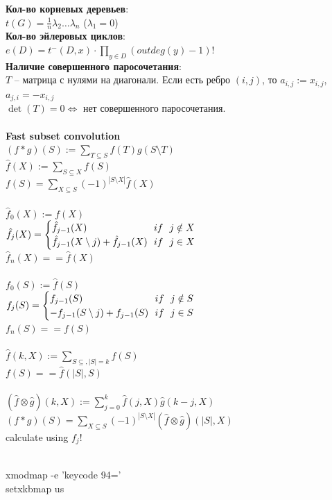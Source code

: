 \documentclass[a4paper,10pt, twocolumn]{article}
\begin{document}
{\bf Кол-во корневых деревьев}:\\
$t(G)=\frac 1 n \lambda_2 \ldots \lambda_n$ ($\lambda_1=0$)\\
{\bf Кол-во эйлеровых циклов}:\\
$e(D)=t^-(D,x) \cdot \prod\limits_{y\in D} (outdeg(y)-1)!$\\
{\bf Наличие совершенного паросочетания}:\\
$T$ -- матрица с нулями на диагонали. Если есть ребро $(i, j)$, то $a_{i,j}:=x_{i,j}$, $a_{j,i}=-x_{i,j}$\\
$\det(T)=0 \Leftrightarrow$ нет совершенного паросочетания.\\\\
{\bf Fast subset convolution}\\
$(f * g)(S) := \sum\limits_{T \subseteq S} f(T) g(S\setminus T)$\\
$\hat{f}(X) := \sum\limits_{S \subseteq X}f(S)$\\
$f(S)=\sum\limits_{X\subseteq S}(-1)^{|S\setminus X|} \hat{f}(X)$\\\\
$\hat{f}_0(X) := f(X)$\\
$\hat{f}_j(X) = \begin{cases}
\hat{f}_{j - 1}(X) \hspace*{\fill} ~~if~~ j \notin X\\
\hat{f}_{j - 1}(X \setminus j) + \hat{f}_{j - 1}(X) \hspace*{\fill} ~~if~~ j \in X 
\end{cases}$\\
$\hat{f}_n(X) == \hat{f}(X)$\\\\
$f_0(S):=\hat{f}(S)$\\
$f_j(S) = \begin{cases}
f_{j - 1}(S) \hspace*{\fill} ~~if~~ j \notin S\\
-f_{j - 1}(S \setminus j) + f_{j - 1}(S) \hspace*{\fill} ~~if~~ j \in S 
\end{cases}$\\
$f_n(S) == f(S)$\\\\
$\hat{f}(k, X) := \sum\limits_{S \subseteq, |S|=k} f(S)$\\
$f(S)==\hat{f}(|S|, S)$\\\\
$(\hat{f} \otimes \hat{g})(k, X) := \sum\limits_{j=0}^k \hat{f}(j, X)\hat{g}(k - j, X)$\\
$(f*g)(S) = \sum\limits_{X\subseteq S} (-1)^{|S\setminus X|}(\hat{f}\otimes\hat{g})(|S|, X)$\\
calculate using $f_j$!\\\\
\pagebreak

xmodmap -e 'keycode 94='\\
setxkbmap us \\
\end{document}
